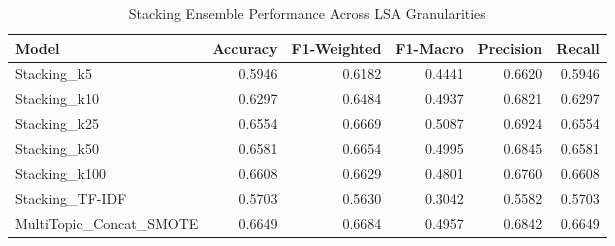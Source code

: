\begin{table}[htbp]
\centering
\caption{Stacking Ensemble Performance Across LSA Granularities}
\label{tab:table2}
\small
\begin{tabular}{lrrrrr}
\toprule
Model & Accuracy & F1-Weighted & F1-Macro & Precision & Recall \\
\midrule
Stacking_k5 & 0.5946 & 0.6182 & 0.4441 & 0.6620 & 0.5946 \\
Stacking_k10 & 0.6297 & 0.6484 & 0.4937 & 0.6821 & 0.6297 \\
Stacking_k25 & 0.6554 & 0.6669 & 0.5087 & 0.6924 & 0.6554 \\
Stacking_k50 & 0.6581 & 0.6654 & 0.4995 & 0.6845 & 0.6581 \\
Stacking_k100 & 0.6608 & 0.6629 & 0.4801 & 0.6760 & 0.6608 \\
Stacking_TF-IDF & 0.5703 & 0.5630 & 0.3042 & 0.5582 & 0.5703 \\
MultiTopic_Concat_SMOTE & 0.6649 & 0.6684 & 0.4957 & 0.6842 & 0.6649 \\
\bottomrule
\end{tabular}
\end{table}
